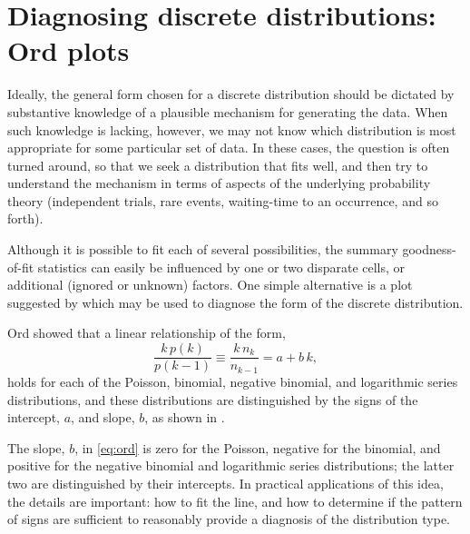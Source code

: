 \documentclass[11pt]{book}\usepackage[]{graphicx}\usepackage[]{color}
\begin{document}

\section{Diagnosing discrete distributions: Ord plots}\label{sec:discrete-ord}

Ideally, the general form chosen for a discrete distribution should
be dictated by substantive knowledge of a plausible mechanism
for generating the data.
When such knowledge is lacking, however,
we may not know which distribution is most appropriate for
some particular set of data.
In these cases, the question is often turned around, so that we seek
a distribution that fits well, and then try to understand the mechanism
in terms of aspects of the underlying probability theory (independent trials,
rare events, waiting-time to an occurrence, and so forth).

Although it is possible to fit each of several possibilities,
the summary goodness-of-fit statistics can easily be influenced by
one or two disparate cells, or additional (ignored or unknown) factors.
One simple alternative is a plot suggested by
\citet{Ord:67} which may be used to diagnose
the form of the discrete distribution.  

Ord showed that a linear
relationship of the form,
\begin{equation} \label{eq:ord}
  \frac{ k \,  p(k) } { p(k-1) }
\equiv \frac{ k \,  n_k } { n_{k-1} }
 = a  +  b \,  k \comma
\end{equation}
holds for each of the Poisson, binomial, negative binomial, and
logarithmic series distributions, and these distributions are
distinguished by the signs of the intercept,
$a$, and slope, $b$, as shown in
.


The slope, \(b\),
in \eqref{eq:ord} is zero for the
Poisson, negative for the binomial, and positive for the negative
binomial and logarithmic series distributions; the latter two are
distinguished by their intercepts. In practical applications of this
idea, the details are important:  how to fit the line, and how to determine
if the pattern of signs are sufficient to reasonably provide a
diagnosis of the distribution type.
\end{document}
